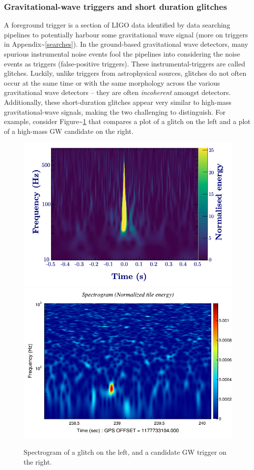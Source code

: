 \documentclass[%
 reprint,
 amsmath,amssymb,
 aps,
]{revtex4}
\begin{document}
\hypertarget{gravitational-wave-triggers-and-short-duration-glitches}{%
\subsubsection{Gravitational-wave triggers and short duration glitches}\label{gravitational-wave-triggers-and-short-duration-glitches}}

A foreground trigger is a section of LIGO data identified by data searching pipelines to potentially harbour some
gravitational wave signal (more on triggers in Appendix\textasciitilde\ref{searches}). In the ground-based gravitational wave
detectors, many spurious instrumental noise events fool the pipelines into considering the noise events as triggers
(false-positive triggers). These instrumental-triggers are called glitches. Luckily, unlike triggers from astrophysical
sources, glitches do not often occur at the same time or with the same morphology across the various gravitational wave
detectors -- they are often \emph{incoherent} amongst detectors. Additionally, these short-duration glitches appear very
similar to high-mass gravitational-wave signals, making the two challenging to distinguish. For example, consider
Figure\textasciitilde\ref{fig:compareGlitchAndSignal} that compares a plot of a glitch on the left and a plot of a high-mass GW
candidate on the right.



\begin{figure}

{\centering \includegraphics[width=0.45\linewidth]{images/glitch} \includegraphics[width=0.45\linewidth]{images/L1_spectrogram_logy_0} 

}

\caption[Comparing glitches to high-mass candidates.]{Spectrogram of a glitch on the left, and a candidate GW trigger on the right.}\label{fig:compareGlitchAndSignal}
\end{figure}
\end{document}
